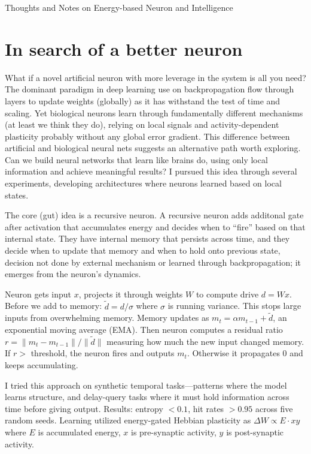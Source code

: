 \documentclass[11pt]{article}
\begin{document}
\begin{center}
{\Large Thoughts and Notes on Energy-based Neuron and Intelligence}
\end{center}

\vspace{0.5em}

\section*{In search of a better neuron}

What if a novel artificial neuron with more leverage in the system is all you need? The dominant paradigm in deep learning use on backpropagation flow through layers to update weights (globally) as it has withstand the test of time and scaling. Yet biological neurons learn through fundamentally different mechanisms (at least we think they do), relying on local signals and activity-dependent plasticity probably without any global error gradient. This difference between artificial and biological neural nets suggests an alternative path worth exploring. Can we build neural networks that learn like brains do, using only local information and achieve meaningful results? I pursued this idea through several experiments, developing architectures where neurons learned based on local states.

The core (gut) idea is a recursive neuron. A recursive neuron adds additonal gate after activation that accumulates energy and decides when to ``fire'' based on that internal state. They have internal memory that persists across time, and they decide when to update that memory and when to hold onto previous state, decision not done by external mechanism or learned through backpropagation; it emerges from the neuron's dynamics.

Neuron gets input $x$, projects it through weights $W$ to compute drive $d = Wx$. Before we add to memory: $\tilde{d} = d / \sigma$ where $\sigma$ is running variance. This stops large inputs from overwhelming memory. Memory updates as $m_t = \alpha m_{t-1} + \tilde{d}$, an exponential moving average (EMA). Then neuron computes a residual ratio $r = \|m_t - m_{t-1}\| / \|\tilde{d}\|$ measuring how much the new input changed memory. If $r >$ threshold, the neuron fires and outputs $m_t$. Otherwise it propagates 0 and keeps accumulating.

I tried this approach on synthetic temporal tasks---patterns where the model learns structure, and delay-query tasks where it must hold information across time before giving output. Results: entropy $< 0.1$, hit rates $> 0.95$ across five random seeds. Learning utilized energy-gated Hebbian plasticity as $\Delta W \propto E \cdot xy$ where $E$ is accumulated energy, $x$ is pre-synaptic activity, $y$ is post-synaptic activity.
\end{document}

